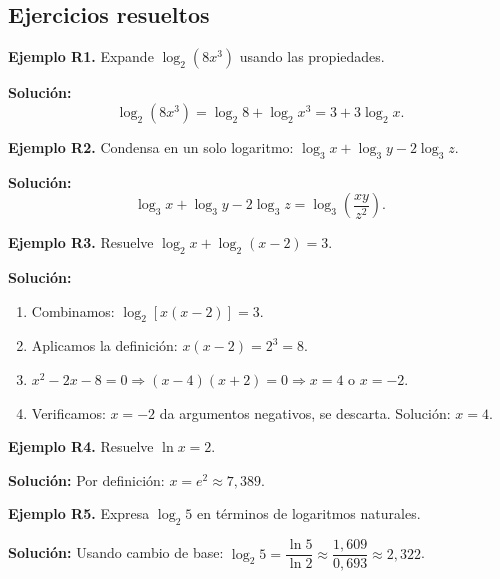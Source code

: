 \documentclass[12pt, letterpaper]{article}
\begin{document}
  \subsection{Ejercicios resueltos}

  \textbf{Ejemplo R1.} Expande $\log_2(8x^3)$ usando las propiedades.

  \begin{cuadrosolucion}
    \textbf{Solución:}
    $$\log_2(8x^3) = \log_2 8 + \log_2 x^3 = 3 + 3\log_2 x.$$
  \end{cuadrosolucion}

  \textbf{Ejemplo R2.} Condensa en un solo logaritmo: $\log_3 x + \log_3 y - 2\log_3 z$.

  \begin{cuadrosolucion}
    \textbf{Solución:}
    $$\log_3 x + \log_3 y - 2\log_3 z = \log_3\left(\frac{xy}{z^2}\right).$$
  \end{cuadrosolucion}

  \textbf{Ejemplo R3.} Resuelve $\log_2 x + \log_2(x - 2) = 3$.

  \begin{cuadrosolucion}
    \textbf{Solución:}
    \begin{enumerate}
      \item Combinamos: $\log_2[x(x - 2)] = 3$.
      \item Aplicamos la definición: $x(x - 2) = 2^3 = 8$.
      \item $x^2 - 2x - 8 = 0 \Rightarrow (x - 4)(x + 2) = 0 \Rightarrow x = 4$ o $x = -2$.
      \item Verificamos: $x = -2$ da argumentos negativos, se descarta. Solución: $x = 4$.
    \end{enumerate}
  \end{cuadrosolucion}

  \textbf{Ejemplo R4.} Resuelve $\ln x = 2$.

  \begin{cuadrosolucion}
    \textbf{Solución:} Por definición: $x = e^2 \approx 7{,}389$.
  \end{cuadrosolucion}

  \textbf{Ejemplo R5.} Expresa $\log_2 5$ en términos de logaritmos naturales.

\begin{cuadrosolucion}
  \textbf{Solución:} Usando cambio de base: $\log_2 5 = \dfrac{\ln 5}{\ln 2} \approx \dfrac{1{,}609}{0{,}693} \approx 2{,}322$.
\end{cuadrosolucion}
\end{document}
